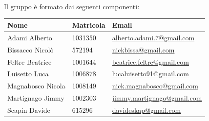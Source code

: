 \documentclass[10pt,a4paper,sans]{moderncv}        %
\begin{document}
Il gruppo è formato dai seguenti componenti: 
\begin{center}
\begin{tabularx}{0.8\linewidth}{|X |X |l|}
\hline
\hspace*{0.2cm} \textbf{Nome} & \hspace*{0.2cm} \textbf{Matricola} & \hspace*{0.2cm} \textbf{Email} \\ \hline

\hspace*{0.2cm} Adami Alberto & \hspace*{0.2cm}1031350 & \hspace*{0.2cm}\href{mailto:alberto.adami.7@gmail.com}{alberto.adami.7@gmail.com} \\ \hline

\hspace*{0.2cm} Bissacco Nicolò & \hspace*{0.2cm}572194 & \hspace*{0.2cm}\href{mailto:nickbissa@gmail.com}{nickbissa@gmail.com} \\ \hline

 \hspace*{0.2cm} Feltre Beatrice &\hspace*{0.2cm}1001644 & \hspace*{0.2cm}\href{mailto:beatrice.feltre@gmail.com}{beatrice.feltre@gmail.com} \\ \hline
 
\hspace*{0.2cm} Luisetto Luca &\hspace*{0.2cm}1006878  & \hspace*{0.2cm}\href{mailto:lucaluisetto91@gmail.com}{lucaluisetto91@gmail.com} \\ \hline

\hspace*{0.2cm} Magnabosco Nicola & \hspace*{0.2cm}1008149 & \hspace*{0.2cm}\href{mailto:nick.magnabosco@gmail.com}{nick.magnabosco@gmail.com} \\ \hline

\hspace*{0.2cm} Martignago Jimmy & \hspace*{0.2cm}1002303 & \hspace*{0.2cm}\href{mailto:jimmy.martignago@gmail.com}{jimmy.martignago@gmail.com} \\ \hline

\hspace*{0.2cm} Scapin Davide & \hspace*{0.2cm}615296 & \hspace*{0.2cm}\href{mailto:davideskap@gmail.com}{davideskap@gmail.com} \\
\hline
\end{tabularx}
\end{center}
\end{document}
